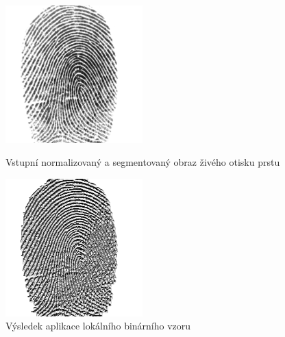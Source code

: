\begin{figure}[htbp]
  \begin{minipage}[b]{0.5\linewidth}
    \centering
    \includegraphics[width=200px]{obrazky-figures/107_7.png}
    \caption{Vstupní normalizovaný a segmentovaný obraz živého otisku prstu}
  \end{minipage}
  \hspace{0.5cm}
  \begin{minipage}[b]{0.5\linewidth}
    \centering
    \includegraphics[width=200px]{obrazky-figures/107_7lbp.png}
    \caption{Výsledek aplikace lokálního binárního vzoru}
  \end{minipage}
\end{figure}

